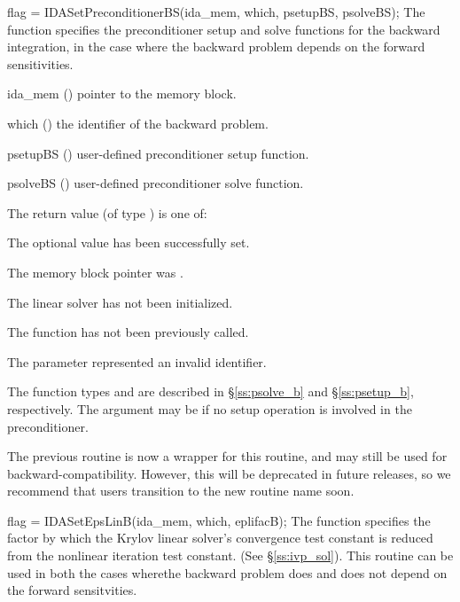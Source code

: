 {
  flag = IDASetPreconditionerBS(ida\_mem, which, psetupBS, psolveBS);
}
{
  The function  specifies the preconditioner
  setup and solve functions for the backward integration, in the case
  where the backward problem depends on the forward sensitivities.
}
{
  \begin{args}[psetupBS]
  \item[ida\_mem] ()
    pointer to the {\idas} memory block.
  \item[which] ()
    the identifier of the backward problem.
  \item[psetupBS] ()
    user-defined preconditioner setup function.
  \item[psolveBS] ()
    user-defined preconditioner solve function.
  \end{args}
}
{
  The return value  (of type ) is one of:
  \begin{args}
  \item[\Id{IDALS\_SUCCESS}]
    The optional value has been successfully set.
  \item[\Id{IDALS\_MEM\_NULL}]
    The  memory block pointer was .
  \item[\Id{IDALS\_LMEM\_NULL}]
    The {\idals} linear solver has not been initialized.
  \item[\Id{IDALS\_NO\_ADJ}]
    The function  has not been previously called.
  \item[\Id{IDALS\_ILL\_INPUT}]
    The parameter  represented an invalid identifier.
  \end{args}
}
{
  The function types  and  are
  described in \S\ref{ss:psolve_b} and \S\ref{ss:psetup_b}, respectively.
  The  argument may be  if no setup operation is involved
  in the preconditioner.

  The previous routine  is now a
  wrapper for this routine, and may still be used for
  backward-compatibility.  However, this will be deprecated in future
  releases, so we recommend that users transition to the new routine
  name soon.
}
{
  flag = IDASetEpsLinB(ida\_mem, which, eplifacB);
}
{
  The function  specifies the factor by
  which the Krylov linear solver's convergence test constant is reduced
  from the nonlinear iteration test constant. (See \S\ref{ss:ivp_sol}).
  This routine can be used in both the cases wherethe backward problem
  does and does not depend on the forward sensitvities.
}
